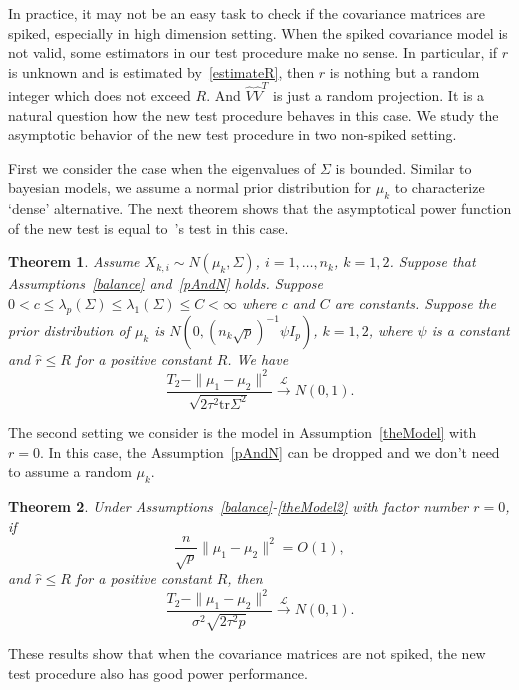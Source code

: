 \documentclass[review]{elsarticle}
\theoremstyle{plain}
\newtheorem{theorem}{\quad\quad Theorem}
\theoremstyle{definition}
\theoremstyle{remark}
\begin{document}
In practice, it may not be an easy task to check if the covariance matrices are spiked, especially in high dimension setting.
When the spiked covariance model is not valid,
some estimators in our test procedure make no sense.
In particular, if $r$ is unknown and is estimated by~\eqref{estimateR}, then $\hat{r}$ is nothing but a random integer which does not exceed $R$.
And $\hat{V}\hat{V}^T$ is just a random projection.
It is a natural question how the new test procedure behaves in this case.
We study the asymptotic behavior of the new test procedure in two non-spiked setting.

First we consider the case  when the eigenvalues of $\Sigma$ is bounded.
Similar to bayesian models, we assume a normal prior distribution for $\mu_k$ to characterize `dense' alternative.
The next theorem shows that the asymptotical power function of the new test is  equal to~\cite{Chen2010A}'s test in this case.


\begin{theorem}\label{sameTheorem}
   Assume $X_{k,i}\sim N(\mu_k,\Sigma)$,  $i=1,\ldots,n_k$, $k=1,2$.
    Suppose that Assumptions~\ref{balance} and~\ref{pAndN} holds. Suppose $0<c\leq\lambda_p(\Sigma)\leq\lambda_1(\Sigma)\leq C<\infty$ where $c$ and $C$ are constants.
    Suppose the prior distribution of $\mu_k$ is $N(0,{(n_k\sqrt{p})}^{-1}\psi I_p)$, $k=1,2$, where $\psi$ is a constant and  $\hat{r}\leq R$ for a positive constant $R$.
    We have
\begin{equation*}
    \frac{T_2-\|\mu_1-\mu_2\|^2}{\sqrt{2\tau^2 \mathrm{tr}\Sigma^2}} \xrightarrow{\mathcal{L}} N(0,1).
\end{equation*}
\end{theorem}

The second setting we consider is the model in Assumption~\ref{theModel} with $r=0$.
In this case, the Assumption~\ref{pAndN} can be dropped and we don't need to assume a random $\mu_k$.

\begin{theorem}\label{sameTheorem2}
    Under Assumptions~\ref{balance}-\ref{theModel2} with factor number $r=0$, if
    $$
    \frac{n}{\sqrt{p}}\|\mu_1-\mu_2\|^2=O(1),
    $$
    and $\hat{r}\leq R$ for a positive constant $R$,
    then
    $$
    \frac{T_2-\|\mu_1-\mu_2\|^2}{\sigma^2\sqrt{2\tau^2 p}}\xrightarrow{\mathcal{L}} N(0,1).
    $$
\end{theorem}
These results show that when the covariance matrices are not spiked, the new test procedure also has good power performance.
\end{document}
